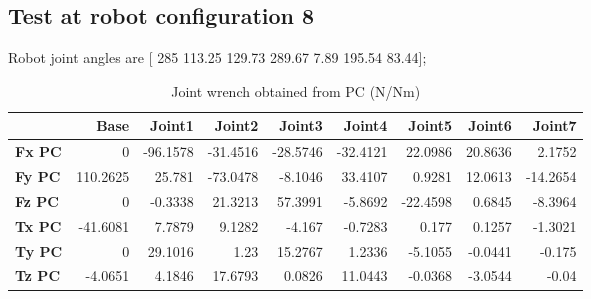 
\subsection{Test at robot configuration 8}
Robot joint angles are  [ 285        113.25        129.73        289.67          7.89        195.54         83.44];

\begin{table}[h!]
	\centering
	\caption{Joint wrench obtained from PC (N/Nm)}
	\label{wrech_PC_Pose8}
	\begin{tabular}{|l|r|r|r|r|r|r|r|r|}
		\hline
		\textbf{}  & \textbf{Base} & \textbf{Joint1}  & \textbf{Joint2}  & \textbf{Joint3}  & \textbf{Joint4}  & \textbf{Joint5}  & \textbf{Joint6}  & \textbf{Joint7} \\ \hline
		\textbf{Fx PC}  & 0        & -96.1578        & -31.4516        & -28.5746        & -32.4121        & 22.0986        & 20.8636        & 2.1752 \\ \hline
		\textbf{Fy PC}  & 110.2625        & 25.781        & -73.0478        & -8.1046        & 33.4107        & 0.9281        & 12.0613        & -14.2654 \\ \hline
		\textbf{Fz PC}  & 0        & -0.3338        & 21.3213        & 57.3991        & -5.8692        & -22.4598        & 0.6845        & -8.3964 \\ \hline
		\textbf{Tx PC}  & -41.6081        & 7.7879        & 9.1282        & -4.167        & -0.7283        & 0.177        & 0.1257        & -1.3021 \\ \hline
		\textbf{Ty PC}  & 0        & 29.1016        & 1.23        & 15.2767        & 1.2336        & -5.1055        & -0.0441        & -0.175 \\ \hline
		\textbf{Tz PC}  & -4.0651        & 4.1846        & 17.6793        & 0.0826        & 11.0443        & -0.0368        & -3.0544        & -0.04 \\ \hline
	\end{tabular}
\end{table}

